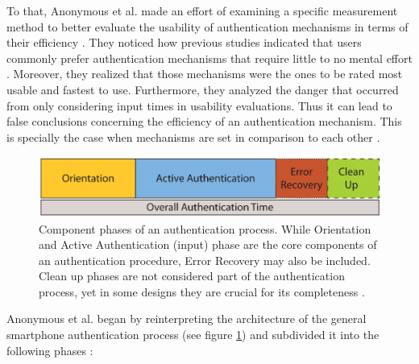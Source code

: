 To that, Anonymous et al. \cite{anonymous} made an effort of examining a specific measurement method to better evaluate the usability of authentication mechanisms in terms of their efficiency \cite{anonymous}. They noticed how previous studies indicated that users commonly prefer authentication mechanisms that require little to no mental effort \cite{anonymous, AnatomySmartphone}. Moreover, they realized that those mechanisms were the ones to be rated most usable and fastest to use. Furthermore, they analyzed the danger that occurred from only considering input times in usability evaluations. Thus it can lead to false conclusions concerning the efficiency of an authentication mechanism. This is specially the case when mechanisms are set in comparison to each other \cite{anonymous}. \\

\begin{figure}[t!]
\centering
\includegraphics[width=13cm, height=2cm]{Chapters/graphics/Phases.PNG}
\caption{Component phases of an authentication process. While Orientation and Active Authentication (input) phase are the core components of an authentication procedure, Error Recovery may also be included. Clean up phases are not considered part of the authentication process, yet in some designs they are crucial for its completeness \cite{anonymous}. }
\label{fig:phases}
\end{figure}

Anonymous et al. \cite{anonymous} began by reinterpreting the architecture of the general smartphone authentication process (see figure \ref{fig:phases}) and subdivided it into the following phases \cite{anonymous}: 

